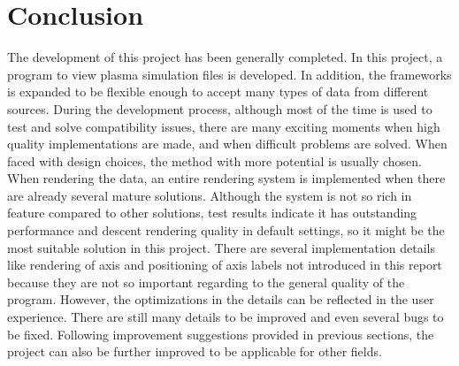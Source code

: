 \section{Conclusion}

The development of this project has been generally completed. In this project, a program to view plasma simulation files is developed. In addition, the frameworks is expanded to be flexible enough to accept many types of data from different sources. During the development process, although most of the time is used to test and solve compatibility issues, there are many exciting moments when high quality implementations are made, and when difficult problems are solved. When faced with design choices, the method with more potential is usually chosen. When rendering the data, an entire rendering system is implemented when there are already several mature solutions. Although the system is not so rich in feature compared to other solutions, test results indicate it has outstanding performance and descent rendering quality in default settings, so it might be the most suitable solution in this project. There are several implementation details like rendering of axis and positioning of axis labels not introduced in this report because they are not so important regarding to the general quality of the program. However, the optimizations in the details can be reflected in the user experience. There are still many details to be improved and even several bugs to be fixed. Following improvement suggestions provided in previous sections, the project can also be further improved to be applicable for other fields.




